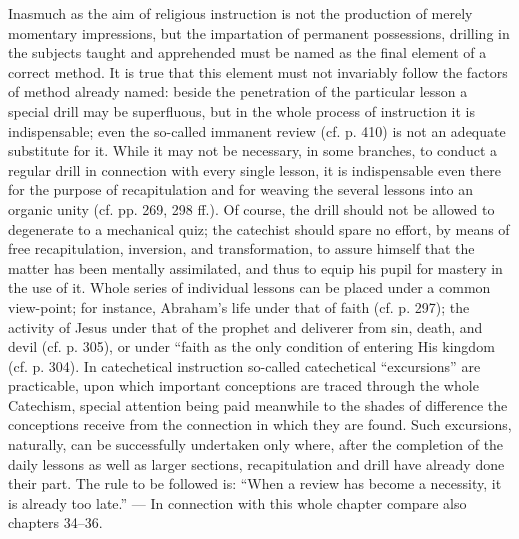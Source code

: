 Inasmuch as the aim of religious instruction is not the production of merely momentary impressions, but the impartation of permanent possessions, drilling in the subjects taught and apprehended must be named as the final element of a correct method. It is true that this element must not invariably follow the factors of method already named: beside the penetration of the particular lesson
a special drill may be superfluous, but in the whole process of instruction it is indispensable; even the so-called immanent review (cf. p. 410) is not an adequate substitute for it. While it may not be necessary, in some branches, to conduct a regular drill in connection with every single lesson, it is indispensable even there for the purpose of recapitulation and for weaving the several lessons into an organic unity (cf. pp. 269, 298 ff.). Of course, the drill should not be allowed to degenerate to a mechanical quiz; the catechist should spare no effort, by means of free recapitulation, inversion, and transformation, to assure himself that the matter has been mentally assimilated, and thus to equip his pupil for mastery in the use of it. Whole series of individual lessons can be placed under a common view-point; for instance, Abraham’s life under that of faith (cf. p. 297); the activity of Jesus under that of the prophet and deliverer from sin, death, and devil (cf. p. 305), or under “faith as the only condition of entering His kingdom (cf. p. 304). In catechetical instruction so-called catechetical “excursions” are practicable, upon which important conceptions are traced through the whole Catechism, special attention being paid meanwhile to the shades of difference the conceptions receive from the connection in which they are found. Such excursions, naturally, can be successfully undertaken only where, after the completion of the daily lessons as well as larger sections, recapitulation and drill have already done their part. The rule to be followed is: “When a review has become a necessity, it is already too late.” — In connection with this whole chapter compare also chapters 34–36.

